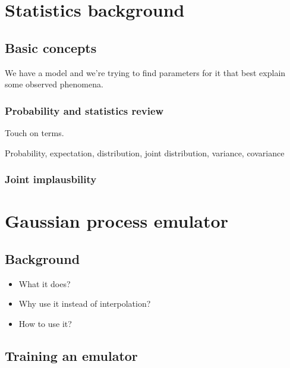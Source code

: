 %

\section{Statistics background}

\subsection{Basic concepts}

We have a model and we're trying to find parameters for it that best explain some observed phenomena.

\subsubsection{Probability and statistics review}

Touch on terms.

Probability, expectation, distribution, joint distribution, variance, covariance

\subsubsection{Joint implausbility}

\section{Gaussian process emulator}

\subsection{Background}

\begin{itemize}

See Chris Coleman-Smith's presentation at the June 2012 MADAI meeting on this

\item What it does?

\item Why use it instead of interpolation?

\item How to use it?

\end{itemize}

\subsection{Training an emulator}

